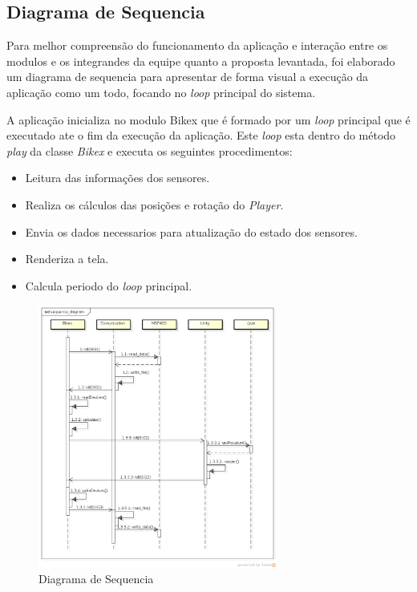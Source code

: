 \subsection{Diagrama de Sequencia} %
\label{sec:diagrama_de_sequencia}

Para melhor compreensão do funcionamento da aplicação e interação entre os modulos e os integrandes da equipe quanto a proposta levantada, foi elaborado um diagrama de sequencia para apresentar de forma visual a execução da aplicação como um todo, focando no \textit{loop} principal do sistema.

A aplicação inicializa no modulo Bikex que é formado por um \textit{loop} principal que é executado ate o fim da execução da aplicação. Este \textit{loop} esta dentro do método \textit{play} da classe \textit{Bikex}  e executa os seguintes procedimentos:


\begin{itemize}
	\item Leitura das informações dos sensores.
	\item Realiza os cálculos das posições e rotação do \textit{Player}.
	\item Envia os dados necessarios para atualização do estado dos sensores.
	\item Renderiza a tela.
	\item Calcula periodo do \textit{loop} principal.
\end{itemize}


\begin{figure}[h]
  \centering
	\includegraphics[width=0.7\textwidth]{figuras/sequence_diagram}
  \caption{Diagrama de Sequencia}
  \label{fig:diagrama-sequencia}
\end{figure}


